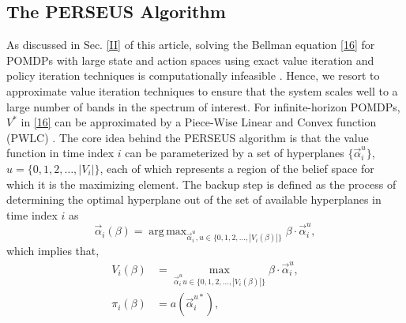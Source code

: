 \documentclass[10pt,twocolumn]{IEEEtran}
\DeclareMathOperator*{\argmax}{arg\,max}
\begin{document}
\subsection{The PERSEUS Algorithm}
As discussed in Sec. \ref{II} of this article, solving the Bellman equation \eqref{16} for POMDPs with large state and action spaces using exact value iteration and policy iteration techniques is computationally infeasible \cite{DBLP:journals/corr/abs-1109-2145}. Hence, we resort to approximate value iteration techniques to ensure that the system scales well to a large number of bands in the spectrum of interest. For infinite-horizon POMDPs, $V^*$ in \eqref{16} can be approximated by a Piece-Wise Linear and Convex function (PWLC) \cite{DBLP:journals/corr/abs-1109-2145}. The core idea behind the PERSEUS algorithm is that the value function in time index $i$ can be parameterized by a set of hyperplanes $\{\vec{\alpha}_i^{u}\}$, $u = \{0,1,2,\dots,|V_i|\}$, each of which represents a region of the belief space for which it is the maximizing element. The backup step is defined as the process of determining the optimal hyperplane out of the set of available hyperplanes in time index $i$ as
\begin{equation}\label{39}
    \vec{\alpha}_{i}(\beta) = \argmax_{\vec{\alpha}_{i}^u, u {\in} \{0, 1, 2, \dots, |V_i(\beta)|\}} \beta \cdot \vec{\alpha}_{i}^u,
\end{equation}
which implies that,
\begin{equation}\label{40}
    \begin{split}
        V_i(\beta) &= \max_{\vec{\alpha}_{i}^u u {\in} \{0, 1, 2, \dots, |V_i(\beta)|\}} \beta \cdot \vec{\alpha}_{i}^u,\\
        \pi_i(\beta) &= a(\vec{\alpha}_i^{u*}),
    \end{split}
\end{equation}
\end{document}
